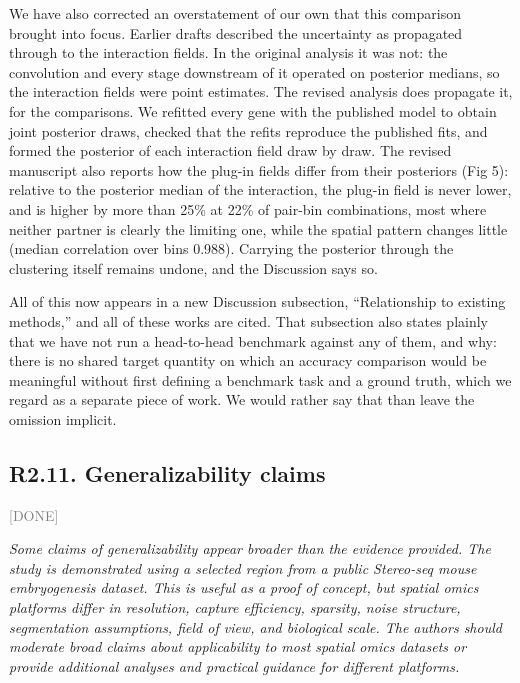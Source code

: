 \documentclass[11pt]{article}
\newcommand{\status}[1]{\textcolor{gray}{\small\textsf{[#1]}}}
\newenvironment{rev}{\begin{leftbar}\itshape\small}{\end{leftbar}}
\begin{document}
We have also corrected an overstatement of our own that this comparison brought into focus.
Earlier drafts described the uncertainty as propagated through to the interaction fields. In the
original analysis it was not: the convolution and every stage downstream of it operated on
posterior medians, so the interaction fields were point estimates. The revised analysis does
propagate it, for the comparisons. We refitted every gene with the published model to obtain joint
posterior draws, checked that the refits reproduce the published fits, and formed the posterior of
each interaction field draw by draw. The revised manuscript also reports how the plug-in fields
differ from their posteriors (Fig 5): relative to the posterior median of the interaction, the
plug-in field is never lower, and is higher by more than 25\% at 22\% of pair-bin combinations,
most where neither partner is clearly the limiting one, while the spatial pattern changes little
(median correlation over bins 0.988). Carrying the posterior through the clustering itself remains
undone, and the Discussion says so.

All of this now appears in a new Discussion subsection, ``Relationship to existing
methods,'' and all of these works are cited. That subsection also states plainly that we have
not run a head-to-head benchmark against any of them, and why: there is no shared target
quantity on which an accuracy comparison would be meaningful without first defining a
benchmark task and a ground truth, which we regard as a separate piece of work. We would
rather say that than leave the omission implicit.

\subsection{R2.11. Generalizability claims} \status{DONE}

\begin{rev}
Some claims of generalizability appear broader than the evidence provided. The study is
demonstrated using a selected region from a public Stereo-seq mouse embryogenesis dataset.
This is useful as a proof of concept, but spatial omics platforms differ in resolution,
capture efficiency, sparsity, noise structure, segmentation assumptions, field of view, and
biological scale. The authors should moderate broad claims about applicability to most
spatial omics datasets or provide additional analyses and practical guidance for different
platforms.
\end{rev}
\end{document}
